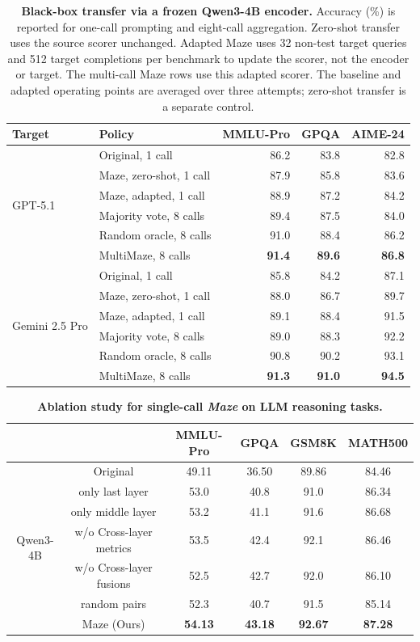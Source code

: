 \begin{table}[htbp]
\caption{\textbf{Black-box transfer via a frozen Qwen3-4B encoder.}
Accuracy (\%) is reported for one-call prompting and eight-call aggregation.
Zero-shot transfer uses the source scorer unchanged.
Adapted Maze uses 32 non-test target queries and 512 target completions per benchmark to update the scorer, not the encoder or target.
The multi-call Maze rows use this adapted scorer.
The baseline and adapted operating points are averaged over three attempts; zero-shot transfer is a separate control.}
\label{tab: eval-gpt5}
\centering\small
\begin{tabular}{@{}llrrr@{}}
\toprule
Target & Policy & MMLU-Pro & GPQA & AIME-24\\ \midrule
\multirow{6}{*}{GPT-5.1}
 & Original, 1 call &86.2&83.8&82.8\\
 & Maze, zero-shot, 1 call &87.9&85.8&83.6\\
 & Maze, adapted, 1 call &88.9&87.2&84.2\\
 & Majority vote, 8 calls &89.4&87.5&84.0\\
 & Random oracle, 8 calls &91.0&88.4&86.2\\
 & MultiMaze, 8 calls &\textbf{91.4}&\textbf{89.6}&\textbf{86.8}\\ \midrule
\multirow{6}{*}{Gemini 2.5 Pro}
 & Original, 1 call &85.8&84.2&87.1\\
 & Maze, zero-shot, 1 call &88.0&86.7&89.7\\
 & Maze, adapted, 1 call &89.1&88.4&91.5\\
 & Majority vote, 8 calls &89.0&88.3&92.2\\
 & Random oracle, 8 calls &90.8&90.2&93.1\\
 & MultiMaze, 8 calls &\textbf{91.3}&\textbf{91.0}&\textbf{94.5}\\
\bottomrule
\end{tabular}
\vspace{-0.1in}
\end{table}

\begin{table}[ht]
\caption{
{\bf Ablation study for single-call \emph{Maze} on LLM reasoning tasks.}
}
\label{app-tab: ablation}
\centering
\small
\begin{tabular}{@{}cccccc@{}}
\toprule
 &  & MMLU-Pro & GPQA & GSM8K & MATH500 \\ \midrule
\multirow{7}{*}{Qwen3-4B} 
 & Original & 49.11 & 36.50 & 89.86 & 84.46 \\
 & only last layer & 53.0 & 40.8 & 91.0 & 86.34 \\
 & only middle layer & 53.2 & 41.1 & 91.6 & 86.68 \\
 & w/o Cross-layer metrics & 53.5 & 42.4 & 92.1 & 86.46 \\
 & w/o Cross-layer fusions & 52.5 & 42.7 & 92.0 & 86.10 \\
 & random pairs & 52.3 & 40.7 & 91.5 & 85.14 \\
 &  Maze (Ours) & {\bf 54.13} & {\bf 43.18} & {\bf 92.67} & {\bf 87.28} \\ \bottomrule
\end{tabular}
\end{table}

